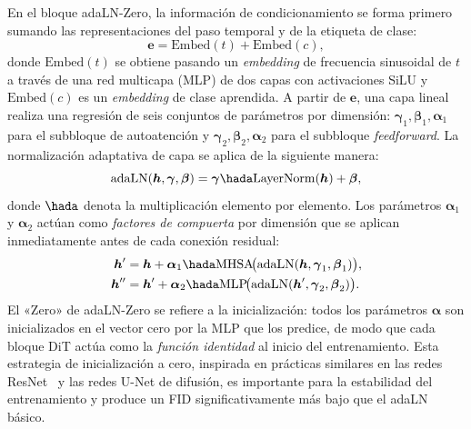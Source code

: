 \documentclass[../../book-main_es.tex]{subfiles}
\begin{document}
En el bloque adaLN-Zero, la información de condicionamiento se forma primero sumando las representaciones del paso temporal y de la etiqueta de clase:
\begin{equation}
    \boldsymbol{e} = \mathrm{Embed}(t) + \mathrm{Embed}(c),
\end{equation}
donde $\mathrm{Embed}(t)$ se obtiene pasando un \textit{embedding} de frecuencia sinusoidal 
de $t$ a través de una red multicapa (MLP) de dos capas con activaciones SiLU 
y $\mathrm{Embed}(c)$ es un \textit{embedding} de clase aprendida. A partir de $\boldsymbol{e}$, 
una capa lineal realiza una regresión de seis conjuntos de parámetros por dimensión: 
$\boldsymbol{\gamma}_1, \boldsymbol{\beta}_1, \boldsymbol{\alpha}_1$ para el subbloque de 
autoatención y $\boldsymbol{\gamma}_2, \boldsymbol{\beta}_2, \boldsymbol{\alpha}_2$ para 
el subbloque \textit{feedforward}. La normalización adaptativa de capa se aplica de 
la siguiente manera:
\begin{equation}
    \mathrm{adaLN}(\boldsymbol{h}, \boldsymbol{\gamma}, \boldsymbol{\beta}) = \boldsymbol{\gamma} \hada \mathrm{LayerNorm}(\boldsymbol{h}) + \boldsymbol{\beta},
\end{equation}
donde $\hada$ denota la multiplicación elemento por elemento. Los parámetros $\boldsymbol{\alpha}_1$ 
y $\boldsymbol{\alpha}_2$ actúan como \emph{factores de compuerta} por dimensión que se aplican 
inmediatamente antes de cada conexión residual:
\begin{equation}
\begin{aligned}
    \boldsymbol{h}' &= \boldsymbol{h} + \boldsymbol{\alpha}_1 \hada \mathrm{MHSA}\!\big(\mathrm{adaLN}(\boldsymbol{h}, \boldsymbol{\gamma}_1, \boldsymbol{\beta}_1)\big), \\
    \boldsymbol{h}'' &= \boldsymbol{h}' + \boldsymbol{\alpha}_2 \hada \mathrm{MLP}\!\big(\mathrm{adaLN}(\boldsymbol{h}', \boldsymbol{\gamma}_2, \boldsymbol{\beta}_2)\big).
\end{aligned}
\end{equation}
El «Zero» de adaLN-Zero se refiere a la inicialización: todos los parámetros 
$\boldsymbol{\alpha}$ son inicializados en el vector cero por la MLP que los predice, de modo 
que cada bloque DiT actúa como la \emph{función identidad} al inicio del entrenamiento. 
Esta estrategia de inicialización a cero, inspirada en prácticas similares en las redes
ResNet~\citep{goyal2017accurate} y las redes U-Net de difusión, es importante para la estabilidad 
del entrenamiento y produce un FID significativamente más bajo que el adaLN básico.
\end{document}

